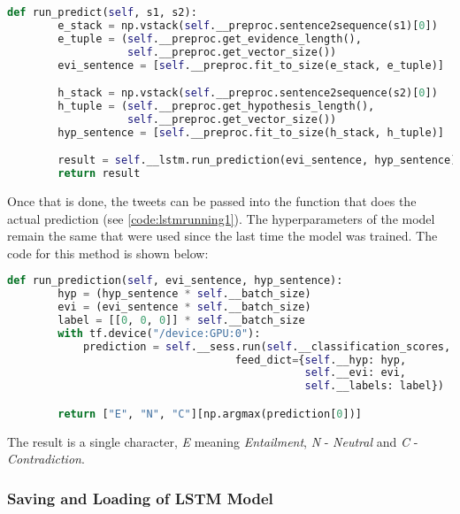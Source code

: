             \begin{lstlisting}[language=Python, caption=Transforming Sentences into Sequences, label=code:lstmrunning1]
    def run_predict(self, s1, s2):
        e_stack = np.vstack(self.__preproc.sentence2sequence(s1)[0])
        e_tuple = (self.__preproc.get_evidence_length(),
                   self.__preproc.get_vector_size())
        evi_sentence = [self.__preproc.fit_to_size(e_stack, e_tuple)]

        h_stack = np.vstack(self.__preproc.sentence2sequence(s2)[0])
        h_tuple = (self.__preproc.get_hypothesis_length(),
                   self.__preproc.get_vector_size())
        hyp_sentence = [self.__preproc.fit_to_size(h_stack, h_tuple)]

        result = self.__lstm.run_prediction(evi_sentence, hyp_sentence)
        return result
            \end{lstlisting}
            \FloatBarrier
            
            Once that is done, the tweets can be passed into the function that does the actual prediction (see \cref{code:lstmrunning1}). The hyperparameters of the model remain the same that were used since the last time the model was trained. The code for this method is shown below:
            
            \begin{lstlisting}[language=Python, caption=Running LSTM Prediction, label=code:lstmrunning2]
    def run_prediction(self, evi_sentence, hyp_sentence):
        hyp = (hyp_sentence * self.__batch_size)
        evi = (evi_sentence * self.__batch_size)
        label = [[0, 0, 0]] * self.__batch_size
        with tf.device("/device:GPU:0"):
            prediction = self.__sess.run(self.__classification_scores,
                                    feed_dict={self.__hyp: hyp,
                                               self.__evi: evi,
                                               self.__labels: label})

        return ["E", "N", "C"][np.argmax(prediction[0])]
            \end{lstlisting}
            \FloatBarrier
            
            The result is a single character, \textit{E} meaning \textit{Entailment}, \textit{N} - \textit{Neutral} and \textit{C} - \textit{Contradiction}.
            
        \subsubsection{Saving and Loading of LSTM Model}
            
